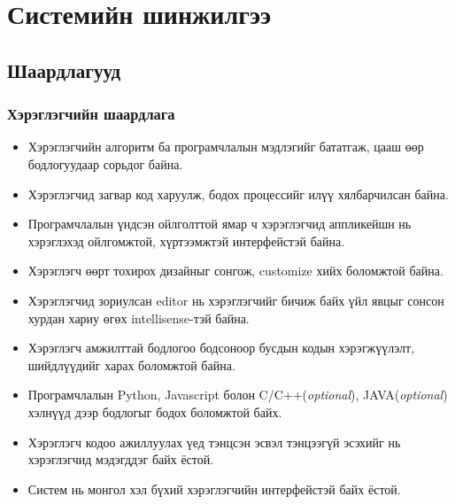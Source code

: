 \chapter{Системийн шинжилгээ}
\section{Шаардлагууд}
\subsection{Хэрэглэгчийн шаардлага}

\begin{itemize}
  \item Хэрэглэгчийн алгоритм ба програмчлалын мэдлэгийг бататгаж, цааш өөр бодлогуудаар сорьдог байна.
  \item Хэрэглэгчид загвар код харуулж, бодох процессийг илүү хялбарчилсан байна.
  \item Програмчлалын үндсэн ойлголттой ямар ч хэрэглэгчид аппликейшн нь хэрэглэхэд ойлгомжтой, хүртээмжтэй интерфейстэй байна.
  \item  Хэрэглэгч өөрт тохирох дизайныг сонгож, customize хийх боломжтой байна.
  \item Хэрэглэгчид зориулсан editor нь хэрэглэгчийг бичиж байх үйл явцыг сонсон хурдан хариу өгөх intellisense-тэй байна.
  \item Хэрэглэгч амжилттай бодлогоо бодсоноор бусдын кодын хэрэгжүүлэлт, шийдлүүдийг харах боломжтой байна.
  \item Програмчлалын Python, Javascript болон C/C++(\textit{optional}), JAVA(\textit{optional}) хэлнүүд дээр бодлогыг бодох боломжтой байх.
  \item Хэрэглэгч кодоо ажиллуулах үед тэнцсэн эсвэл тэнцээгүй эсэхийг нь хэрэглэгчид мэдэгддэг байх ёстой.
  \item Систем нь монгол хэл бүхий хэрэглэгчийн интерфейстэй байх ёстой.
\end{itemize}

